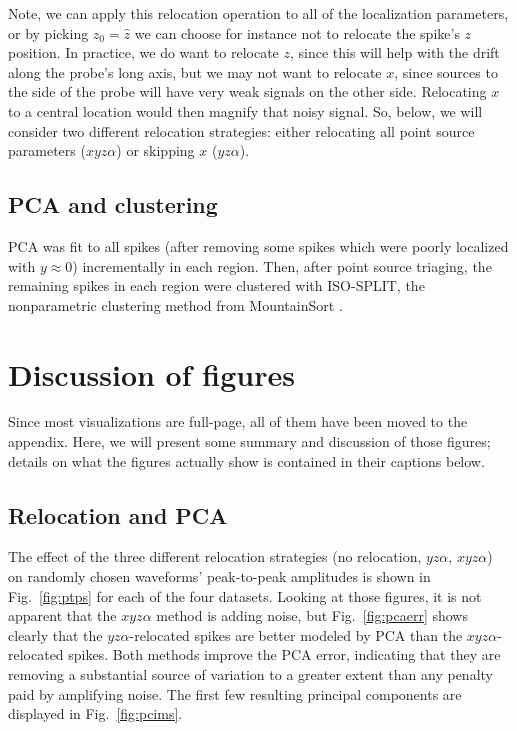 \documentclass[
  12pt,
]{article}
\theoremstyle{plain}
\theoremstyle{definition}
\theoremstyle{remark}
\newcommand{\1}[1]{\mathbb{1}_{{#1}}}
\begin{document}
Note, we can apply this relocation operation to all of the localization parameters, or by picking $z_0=\hat{z}$ we can choose for instance not to relocate the spike's $z$ position. In practice, we do want to relocate $z$, since this will help with the drift along the probe's long axis, but we may not want to relocate $x$, since sources to the side of the probe will have very weak signals on the other side. Relocating $x$ to a central location would then magnify that noisy signal. So, below, we will consider two different relocation strategies: either relocating all point source parameters ($xyz\alpha$) or skipping $x$ ($yz\alpha$).

\subsection{PCA and clustering}

PCA was fit to all spikes (after removing some spikes which were poorly localized with $y\approx0$) incrementally in each region. Then, after point source triaging, the remaining spikes in each region were clustered with ISO-SPLIT, the nonparametric clustering method from MountainSort \cite{mountainsort}.


\section{Discussion of figures}

Since most visualizations are full-page, all of them have been moved to the appendix. Here, we will present some summary and discussion of those figures; details on what the figures actually show is contained in their captions below.

\subsection{Relocation and PCA}

The effect of the three different relocation strategies (no relocation, $yz\alpha$, $xyz\alpha$) on randomly chosen waveforms' peak-to-peak amplitudes is shown in Fig.~\ref{fig:ptps} for each of the four datasets. Looking at those figures, it is not apparent that the $xyz\alpha$ method is adding noise, but Fig.~\ref{fig:pcaerr} shows clearly that the $yz\alpha$-relocated spikes are better modeled by PCA than the $xyz\alpha$-relocated spikes. Both methods improve the PCA error, indicating that they are removing a substantial source of variation to a greater extent than any penalty paid by amplifying noise. The first few resulting principal components are displayed in Fig.~\ref{fig:pcims}.
\end{document}
